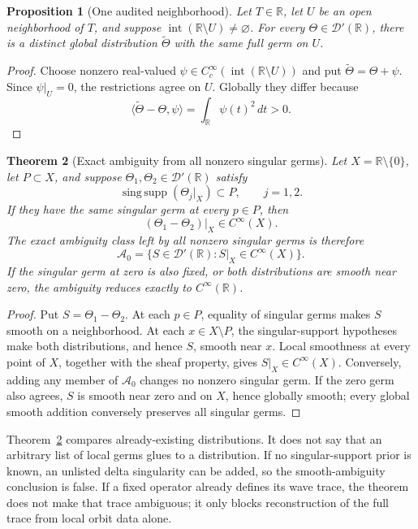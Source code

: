 \documentclass[11pt]{article}
\newtheorem{theorem}{Theorem}
\newtheorem{proposition}[theorem]{Proposition}
\theoremstyle{definition}
\theoremstyle{remark}
\newcommand{\R}{\mathbb{R}}
\newcommand{\D}{\mathcal{D}}
\newcommand{\sing}{\operatorname{sing\,supp}}
\begin{document}
\begin{proposition}[One audited neighborhood]
\label{prop:onegerm}
Let \(T\in\R\), let \(U\) be an open neighborhood of \(T\), and suppose
\(\operatorname{int}(\R\setminus U)\ne\varnothing\).  For every
\(\Theta\in\D'(\R)\), there is a distinct global distribution
\(\widetilde\Theta\) with the same full germ on \(U\).
\end{proposition}

\begin{proof}
Choose nonzero real-valued
\(\psi\in C_c^\infty(\operatorname{int}(\R\setminus U))\) and put
\(\widetilde\Theta=\Theta+\psi\).  Since \(\psi|_U=0\), the restrictions
agree on \(U\).  Globally they differ because
\[
 \langle\widetilde\Theta-\Theta,\psi\rangle
 =\int_{\R}\psi(t)^2\,dt>0.
\]
\end{proof}

\begin{theorem}[Exact ambiguity from all nonzero singular germs]
\label{thm:allgerms}
Let \(X=\R\setminus\{0\}\), let \(P\subset X\), and suppose
\(\Theta_1,\Theta_2\in\D'(\R)\) satisfy
\[
 \sing(\Theta_j|_X)\subset P,\qquad j=1,2.
\]
If they have the same singular germ at every \(p\in P\), then
\[
 (\Theta_1-\Theta_2)|_X\in C^\infty(X).
\]
The exact ambiguity class left by all nonzero singular germs is therefore
\[
 \mathcal A_0=\{S\in\D'(\R):S|_X\in C^\infty(X)\}.
\]
If the singular germ at zero is also fixed, or both distributions are smooth
near zero, the ambiguity reduces exactly to \(C^\infty(\R)\).
\end{theorem}

\begin{proof}
Put \(S=\Theta_1-\Theta_2\).  At each \(p\in P\), equality of singular
germs makes \(S\) smooth on a neighborhood.  At each \(x\in X\setminus P\),
the singular-support hypotheses make both distributions, and hence \(S\),
smooth near \(x\).  Local smoothness at every point of \(X\), together with
the sheaf property, gives \(S|_X\in C^\infty(X)\).  Conversely, adding any
member of \(\mathcal A_0\) changes no nonzero singular germ.  If the zero germ
also agrees, \(S\) is smooth near zero and on \(X\), hence globally smooth;
every global smooth addition conversely preserves all singular germs.
\end{proof}

Theorem~\ref{thm:allgerms} compares already-existing distributions.  It does
not say that an arbitrary list of local germs glues to a distribution.  If no
singular-support prior is known, an unlisted delta singularity can be added,
so the smooth-ambiguity conclusion is false.  If a fixed operator already
defines its wave trace, the theorem does not make that trace ambiguous; it
only blocks reconstruction of the full trace from local orbit data alone.
\end{document}
